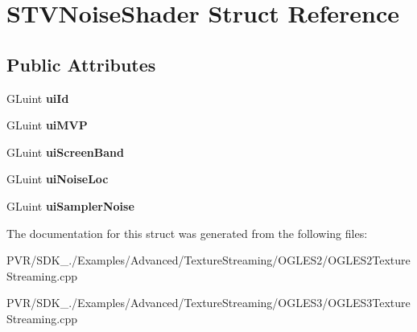 \hypertarget{struct_s_t_v_noise_shader}{\section{S\+T\+V\+Noise\+Shader Struct Reference}
\label{struct_s_t_v_noise_shader}
}
\subsection*{Public Attributes}
\begin{DoxyCompactItemize}
\item 
\hypertarget{struct_s_t_v_noise_shader_ad001f29d664304b2a29b271ce6c3d42e}{G\+Luint {\bfseries ui\+Id}}\label{struct_s_t_v_noise_shader_ad001f29d664304b2a29b271ce6c3d42e}

\item 
\hypertarget{struct_s_t_v_noise_shader_aa47ea37d2012af6d216904610124f474}{G\+Luint {\bfseries ui\+M\+V\+P}}\label{struct_s_t_v_noise_shader_aa47ea37d2012af6d216904610124f474}

\item 
\hypertarget{struct_s_t_v_noise_shader_ad24731220ca870a09ff9f809e3a4eb55}{G\+Luint {\bfseries ui\+Screen\+Band}}\label{struct_s_t_v_noise_shader_ad24731220ca870a09ff9f809e3a4eb55}

\item 
\hypertarget{struct_s_t_v_noise_shader_ad45495bb568c3577b5bd69c30228cf93}{G\+Luint {\bfseries ui\+Noise\+Loc}}\label{struct_s_t_v_noise_shader_ad45495bb568c3577b5bd69c30228cf93}

\item 
\hypertarget{struct_s_t_v_noise_shader_a850476da36cb1b7931cbf570435ace18}{G\+Luint {\bfseries ui\+Sampler\+Noise}}\label{struct_s_t_v_noise_shader_a850476da36cb1b7931cbf570435ace18}

\end{DoxyCompactItemize}


The documentation for this struct was generated from the following files\+:\begin{DoxyCompactItemize}
\item 
P\+V\+R/\+S\+D\+K\+\_./\+Examples/\+Advanced/\+Texture\+Streaming/\+O\+G\+L\+E\+S2/O\+G\+L\+E\+S2\+Texture\+Streaming.\+cpp\item 
P\+V\+R/\+S\+D\+K\+\_./\+Examples/\+Advanced/\+Texture\+Streaming/\+O\+G\+L\+E\+S3/O\+G\+L\+E\+S3\+Texture\+Streaming.\+cpp\end{DoxyCompactItemize}

